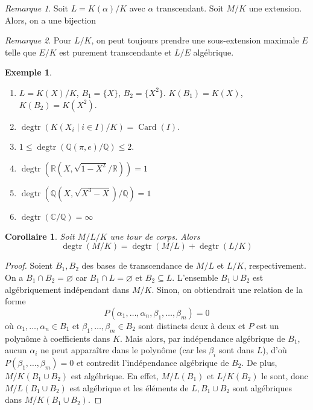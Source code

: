 \documentclass{article}
\newcommand{\Q}{\mathbb{Q}}
\newcommand{\R}{\mathbb{R}}
\newcommand{\C}{\mathbb{C}}
\DeclareMathOperator{\degtr}{degtr}
\DeclareMathOperator{\Card}{Card}
\theoremstyle{plain}
\newtheorem{corollary}[theorem]{Corollaire}
\theoremstyle{definition}
\newtheorem{example}[theorem]{Exemple}
\theoremstyle{remark}
\newtheorem*{remark}{Remarque}
\begin{document}
\begin{remark}
    Soit $L = K(\alpha)/K$ avec $\alpha$ transcendant. Soit $M/K$ une extension. Alors, on a une bijection
    \begin{center}
    \end{center}
\end{remark}

\begin{remark}
    Pour $L/K$, on peut toujours prendre une sous-extension maximale $E$ telle que $E/K$ est purement transcendante et $L/E$ algébrique.
\end{remark}

\begin{example} \leavevmode
    \begin{enumerate}
        \item $L = K(X)/K$, $B_1 = \{X\}$, $B_2 = \{X^2\}$. $K(B_1) = K(X)$, $K(B_2) = K(X^2)$.
        \item $\degtr(K(X_i \mid i \in I)/K) = \Card(I)$.
        \item $1 \le \degtr(\Q(\pi,e)/\Q) \le 2$.
        \item $\degtr(\R(X,\sqrt{1-X^2}/\R)) = 1$
        \item $\degtr(\Q(X,\sqrt{X^3 - X})/\Q) = 1$
        \item $\degtr(\C/\Q) = \infty$
    \end{enumerate}
\end{example}

\begin{corollary}
    Soit $M/L/K$ une tour de corps. Alors
    \[\degtr(M/K) = \degtr(M/L) + \degtr(L/K)\]
\end{corollary}

\begin{proof}
    Soient $B_1,B_2$ des bases de transcendance de $M/L$ et $L/K$, respectivement. On a $B_1 \cap B_2 = \varnothing$ car $B_1 \cap L =\varnothing$ et $B_2 \subseteq L$. L'ensemble $B_1 \cup B_2$ est algébriquement indépendant dans $M/K$. Sinon, on obtiendrait une relation de la forme
    \[P(\alpha_1,\dots,\alpha_n,\beta_1,\dots,\beta_m) = 0\]
    où $\alpha_1,\dots,\alpha_n \in B_1$ et $\beta_1,\dots,\beta_m \in B_2$ sont distincts deux à deux et $P$ est un polynôme à coefficients dans $K$. Mais alors, par indépendance algébrique de $B_1$, aucun $\alpha_i$ ne peut apparaître dans le polynôme (car les $\beta_i$ sont dans $L$), d'où $P(\beta_1,\dots,\beta_m) = 0$ et contredit l'indépendance algébrique de $B_2$. De plus, $M/K(B_1 \cup B_2)$ est algébrique. En effet, $M/L(B_1)$ et $L/K(B_2)$ le sont, donc $M/L(B_1 \cup B_2)$ est algébrique et les éléments de $L,B_1\cup B_2$ sont algébriques dans $M/K(B_1 \cup B_2)$.
\end{proof}
\end{document}
